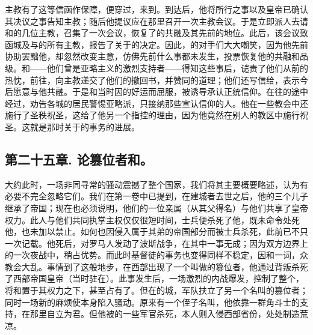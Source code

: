 主教有了这等信函作保障，便穿过，来到。到达后，他将所行之事以及皇帝已确认其决议之事告知主教；随后他提议应在那里召开一次主教会议。于是立即派人去请和的几位主教，召集了一次会议，恢复了的共融及其先前的地位。此后，该会议致函城及与的所有主教，报告了关于的决定。因此，的对手们大大嘲笑，因为他先前协助罢黜他，却忽然改变主意，仿佛先前什么事都未发生，投票恢复他的共融和品级。和——他们曾是亚略主义的激烈支持者——得知这些事后，谴责了他们从前的热忱，前往，向主教递交了他们的撤回书，并赞同的道理；他们还写信给，表示今后愿意与他共融。于是和当时因的好运而屈服，被诱导承认正统信仰。在往的途中经过，劝告各城的居民警惕亚略派，只接纳那些宣认信仰的人。他在一些教会中还施行了圣秩祝圣，这给了他另一个指控的理由，因为他竟然在别人的教区中施行祝圣。这就是那时关于的事务的进展。\par


\subsection{第二十五章. 论篡位者和。}

大约此时，一场非同寻常的骚动震撼了整个国家，我们将其主要概要略述，认为有必要不完全忽略它们。我们在第一卷中已提到，在建城者去世之后，他的三个儿子继承了帝国；现在也必须说明，他们的一位亲属（从其父得名）与他们共享了皇帝权力。此人与他们共同执掌主权仅仅很短时间，士兵便杀死了他，既未命令处死他，也未加以禁止。如何也因侵入属于其弟的帝国部分而被士兵杀死，此前已不只一次记载。他死后，对罗马人发动了波斯战争，在其中一事无成；因为双方边界上的一次夜战中，稍占优势。而此时基督徒的事务也变得同样不稳定，因和一词，众教会大乱。事情到了这般地步，在西部出现了一个叫做的篡位者，他通过背叛杀死了西部帝国皇帝（当时驻在）。此事发生后，一场激烈的内战爆发，控制了整个，将和置于其权力之下，甚至占有了。但在的城，军队扶立了另一个名叫的篡位者；同时一场新的麻烦使本身陷入骚动。原来有一个侄子名叫，他依靠一群角斗士的支持，在那里自立为君。但他被的一些军官杀死，本人则入侵西部省份，处处制造荒凉。\par

